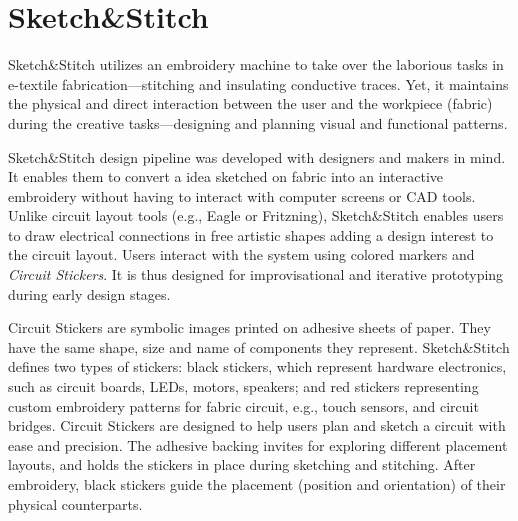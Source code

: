 \documentclass[header.tex]{subfiles}
\begin{document}




\section{Sketch\&Stitch}
Sketch\&Stitch utilizes an embroidery machine to take over the laborious tasks in e-textile fabrication---stitching and insulating conductive traces. Yet, it maintains the physical and direct interaction between the user and the workpiece (fabric) during the creative tasks---designing and planning visual and functional patterns. 

Sketch\&Stitch design pipeline was developed with designers and makers in mind. It enables them to convert a idea sketched on fabric into an interactive embroidery without having to interact with computer screens or CAD tools. Unlike circuit layout tools (e.g., Eagle or Fritzning), Sketch\&Stitch enables users to draw electrical connections in free artistic shapes adding a design interest to the circuit layout. Users interact with the system using colored markers and \textit{Circuit Stickers}. It is thus designed for improvisational and iterative prototyping during early design stages. 




Circuit Stickers are symbolic images printed on adhesive sheets of paper. They have the same shape, size and name of components they represent. Sketch\&Stitch defines two types of stickers: black stickers, which represent hardware electronics, such as circuit boards, LEDs, motors, speakers; and red stickers representing custom embroidery patterns for fabric circuit, e.g., touch sensors, and circuit bridges. Circuit Stickers are designed to help users plan and sketch a circuit with ease and precision. The adhesive backing invites for exploring different placement layouts, and holds the stickers in place during sketching and stitching. After embroidery, black stickers guide the placement (position and orientation) of their physical counterparts.
\end{document}
